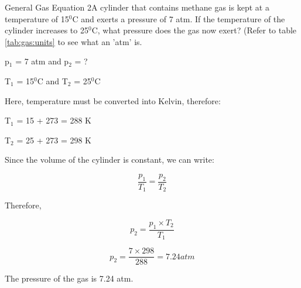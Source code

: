 \begin{wex}{General Gas Equation 2}{A cylinder that contains methane gas is kept at a temperature of 15$^{0}$C and exerts a pressure of 7 atm. If the temperature of the cylinder increases to 25$^{0}$C, what pressure does the gas now exert? (Refer to table \ref{tab:gas:units} to see what an 'atm' is.\\}


{

p$_{1}$ = 7 atm and p$_{2}$ = ?

T$_{1}$ = 15$^{0}$C and T$_{2}$ = 25$^{0}$C\\
}

{
Here, temperature must be converted into Kelvin, therefore:

T$_{1}$ = 15 + 273 = 288 K

T$_{2}$ = 25 + 273 = 298 K\\
}

{

Since the volume of the cylinder is constant, we can write:

\begin{equation*}
\frac{p_{1}}{T_{1}} = \frac{p_{2}}{T_{2}}
\end{equation*}

Therefore,

\begin{equation*}
p_{2} = \frac{p_{1} \times T_{2}}{T_{1}}
\end{equation*}
}

{

\begin{equation*}
p_{2} = \frac{7 \times 298}{288} = 7.24 atm
\end{equation*}

The pressure of the gas is 7.24 atm.
}
\end{wex}

